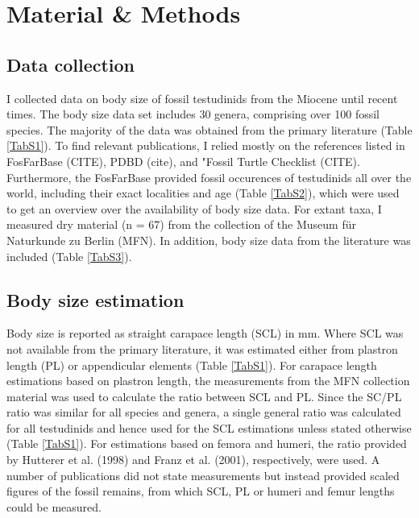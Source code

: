 \section{Material \& Methods}

\subsection{Data collection}
I collected data on body size of fossil testudinids from the Miocene until recent times. The body size data set includes 30 genera, comprising over 100 fossil species. The majority of the data was obtained from the primary literature (Table \ref{TabS1}). To find relevant publications, I relied mostly on the references listed in FosFarBase (CITE), PDBD (cite), and "Fossil Turtle Checklist (CITE).
Furthermore, the FosFarBase provided fossil occurences of testudinids all over the world, including their exact localities and age (Table \ref{TabS2}), which were used to get an overview over the availability of body size data. 
For extant taxa, I measured dry material (n = 67) from the collection of the Museum für Naturkunde zu Berlin (MFN). In addition, body size data from the literature was included (Table \ref{TabS3}).

\subsection{Body size estimation}
Body size is reported as straight carapace length (SCL) in mm. Where SCL was not available from the primary literature, it was estimated either from plastron length (PL) or appendicular elements (Table \ref{TabS1}). For carapace length estimations based on plastron length, the measurements from the MFN collection material was used to calculate the ratio between SCL and PL. Since the SC/PL ratio was similar for all species and genera, a single general ratio was calculated for all testudinids and hence used for the SCL estimations unless stated otherwise (Table \ref{TabS1}). For estimations based on femora and humeri, the ratio provided by Hutterer et al. (1998) and Franz et al. (2001), respectively, were used. A number of publications did not state measurements but instead provided scaled figures of the fossil remains, from which SCL, PL or humeri and femur lengths could be measured.


